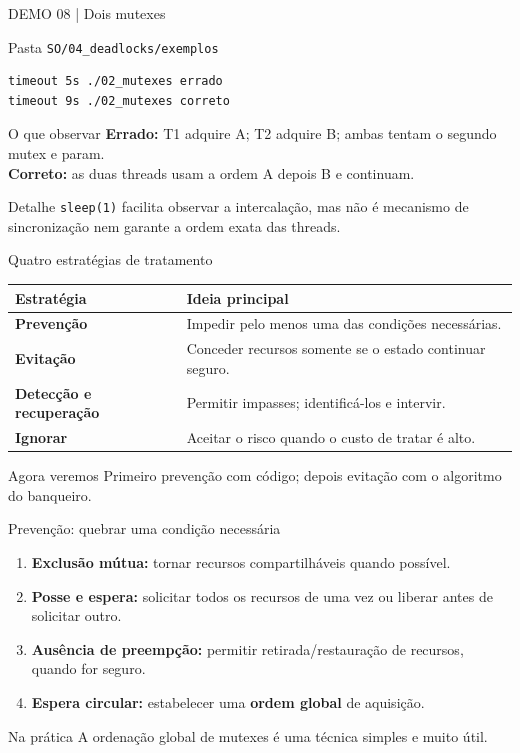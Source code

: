 \documentclass[aspectratio=169,11pt]{beamer}
\begin{document}
\begin{frame}[fragile]{DEMO 08 | Dois mutexes}
\small
\begin{block}{Pasta \texttt{SO/04\_deadlocks/exemplos}}
\begin{verbatim}
timeout 5s ./02_mutexes errado
timeout 9s ./02_mutexes correto
\end{verbatim}
\end{block}
\begin{exampleblock}{O que observar}
\textbf{Errado:} T1 adquire A; T2 adquire B; ambas tentam o segundo mutex e param.\\
\textbf{Correto:} as duas threads usam a ordem A depois B e continuam.
\end{exampleblock}
\begin{alertblock}{Detalhe}
\texttt{sleep(1)} facilita observar a intercalação, mas não é mecanismo de sincronização nem garante a ordem exata das threads.
\end{alertblock}
\end{frame}

\begin{frame}{Quatro estratégias de tratamento}
\small
\begin{tabular}{p{3.0cm}p{6.55cm}}
\toprule
\textbf{Estratégia} & \textbf{Ideia principal}\\
\midrule
\textbf{Prevenção} & Impedir pelo menos uma das condições necessárias.\\[.25cm]
\textbf{Evitação} & Conceder recursos somente se o estado continuar seguro.\\[.25cm]
\textbf{Detecção e recuperação} & Permitir impasses; identificá-los e intervir.\\[.25cm]
\textbf{Ignorar} & Aceitar o risco quando o custo de tratar é alto.\\
\bottomrule
\end{tabular}
\begin{block}{Agora veremos}
Primeiro prevenção com código; depois evitação com o algoritmo do banqueiro.
\end{block}
\end{frame}

\begin{frame}{Prevenção: quebrar uma condição necessária}
\small
\begin{enumerate}
\setlength\itemsep{.6em}
\item \textbf{Exclusão mútua:} tornar recursos compartilháveis quando possível.
\item \textbf{Posse e espera:} solicitar todos os recursos de uma vez ou liberar antes de solicitar outro.
\item \textbf{Ausência de preempção:} permitir retirada/restauração de recursos, quando for seguro.
\item \textbf{Espera circular:} estabelecer uma \textbf{ordem global} de aquisição.
\end{enumerate}
\begin{alertblock}{Na prática}
A ordenação global de mutexes é uma técnica simples e muito útil.
\end{alertblock}
\end{frame}
\end{document}
